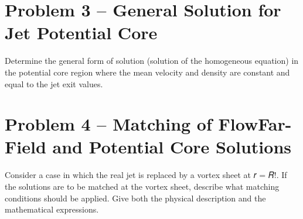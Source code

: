 \documentclass[]{aiaa-tc}%
\begin{document}
\section{Problem 3 -- General Solution for Jet Potential Core} %

Determine the general form of solution (solution of the homogeneous equation) in the potential core region where the mean velocity and density are constant and equal to the jet exit values.


\section{Problem 4 -- Matching of FlowFar-Field and Potential Core Solutions}

Consider a case in which the real jet is replaced by a vortex sheet at 𝑟 = 𝑅!. If the solutions are to be matched at the vortex sheet, describe what matching conditions should be applied. Give both the physical description and the mathematical expressions.





















\end{document}
